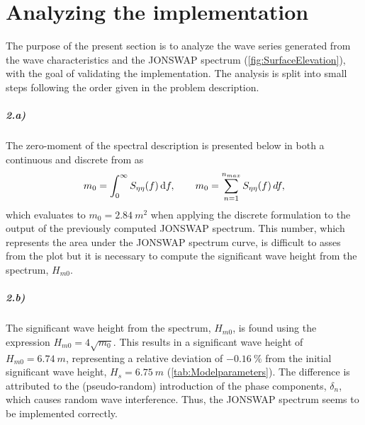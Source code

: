 \vspace{10mm}
{\let\clearpage\relax \chapter{Analyzing the implementation}}

The purpose of the present section is to analyze the wave series generated from the wave characteristics and the JONSWAP spectrum (\cref{fig:SurfaceElevation}), with the goal of validating the implementation. The analysis is split into small steps following the order given in the problem description.

\paragraph{2.a)} The zero-moment of the spectral description is presented below in both a continuous and discrete from as
\begin{equation}
    m_0 = \int_0^\infty S_{\eta \eta}(f) \dif f, \qquad m_0 = \sum_{n=1}^{n_{max}} S_{\eta\eta}(f)\,df,
\end{equation}
which evaluates to $m_0=\SI{2.84}{m^2}$ when applying the discrete formulation to the output of the previously computed JONSWAP spectrum. This number, which represents the area under the JONSWAP spectrum curve, is difficult to asses from the plot but it is necessary to compute the significant wave height from the spectrum, $H_{m0}$.
\squeezeup
\paragraph{2.b)} The significant wave height from the spectrum, $H_{m0}$, is found using the expression $H_{m0} = 4\sqrt{m_0}$. This results in a significant wave height of $H_{m0}=\SI{6.74}{m}$, representing a relative deviation of $\SI{-0.16}{\percent}$ from the initial significant wave height, $H_s=\SI{6.75}{m}$ (\cref{tab:Modelparameters}). The difference is attributed to the (pseudo-random) introduction of the phase components, $\delta_n$, which causes random wave interference. Thus, the JONSWAP spectrum seems to be implemented correctly. 

